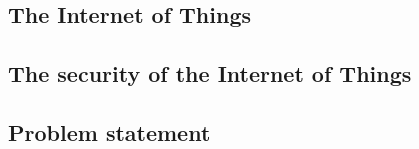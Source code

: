 \subsection[IoT]{The Internet of Things}


\subsection[IoT Security]{The security of the Internet of Things}

\subsection{Problem statement}
